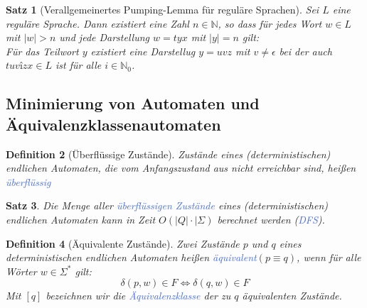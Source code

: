 \documentclass[11pt]{article}
\newcommand{\tcol}[1]{\textcolor{RoyalBlue}{#1}}
\theoremstyle{break}
\newtheorem{satz}{Satz}[section]
\newtheorem{defi}[satz]{Definition}
\begin{document}
\begin{satz}[Verallgemeinertes Pumping-Lemma für reguläre Sprachen]
Sei $L$ eine reguläre Sprache. Dann existiert eine Zahl $n\in\mathbb{N}$, so dass für jedes Wort $w\in L$ mit $|w|>n$ und jede Darstellung $w=tyx$ mit $|y|=n$ gilt:\\
Für das Teilwort $y$ existiert eine Darstellug $y=uvz$ mit $v\neq\epsilon$ bei der auch $tuvîzx\in L$ ist für alle $i\in\mathbb{N}_0$.
\end{satz}


\subsection{Minimierung von Automaten und Äquivalenzklassenautomaten}

\begin{defi}[Überflüssige Zustände]
Zustände eines (deterministischen) endlichen Automaten, die vom Anfangszustand aus nicht erreichbar sind, heißen \tcol{überflüssig}
\end{defi}

\begin{satz}
Die Menge aller \tcol{überflüssigen Zustände} eines (deterministischen) endlichen Automaten kann in Zeit $O(|Q|\cdot |\Sigma)$ berechnet werden (\tcol{DFS}).
\end{satz}

\begin{defi}[Äquivalente Zustände]
Zwei Zustände $p$ und $q$ eines deterministischen endlichen Automaten heißen \tcol{äquivalent}$(p\equiv q)$, wenn für alle Wörter $w\in\Sigma^*$ gilt:
\[\delta(p,w)\in F\Leftrightarrow\delta(q,w)\in F\]
Mit $[q]$ bezeichnen wir die \tcol{Äquivalenzklasse} der zu $q$ äquivalenten Zustände.
\end{defi}
\end{document}
